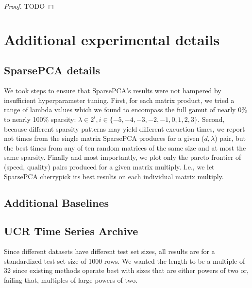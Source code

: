 \begin{proof}
TODO
\end{proof}


\vfill\break  %
\section{Additional experimental details} \label{sec:experimentDetails}

\subsection{SparsePCA details}

We took steps to ensure that SparsePCA's results were not hampered by insufficient hyperparameter tuning. First, for each matrix product, we tried a range of lambda values which we found to encompass the full gamut of nearly 0\% to nearly 100\% sparsity: $\lambda \in 2^i, i \in \{-5, -4, -3, -2, -1, 0, 1, 2, 3\}$. Second, because different sparsity patterns may yield different exeuction times, we report not times from the single matrix SparsePCA produces for a given ($d, \lambda$) pair, but the best times from any of ten random matrices of the same size and at most the same sparsity. Finally and most importantly, we plot only the pareto frontier of (speed, quality) pairs produced for a given matrix multiply. I.e., we let SparsePCA cherrypick its best results on each individual matrix multiply.

\subsection{Additional Baselines}

\subsection{UCR Time Series Archive}

Since different datasets have different test set sizes, all results are for a standardized test set size of 1000 rows. We wanted the length to be a multiple of 32 since existing methods operate best with sizes that are either powers of two or, failing that, multiples of large powers of two.

